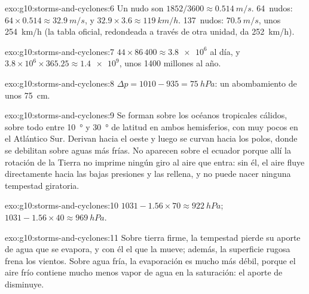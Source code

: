\begin{solution}{exo:g10:storms-and-cyclones:6}
Un nudo son $1852/3600 \approx \qty{0.514}{m/s}$. \num{64}~nudos: $64 \times
0.514 \approx \qty{32.9}{m/s}$, y $32.9 \times 3.6 \approx
\qty{119}{km/h}$. \num{137}~nudos: $\qty{70.5}{m/s}$, unos
\qty{254}{km/h} (la tabla oficial, redondeada a través de otra unidad, da
\qty{252}{km/h}).
\end{solution}

\begin{solution}{exo:g10:storms-and-cyclones:7}
$44 \times 86\,400 \approx \num{3.8e6}$  al día, y $3.8\times10^6
\times 365.25 \approx \num{1.4e9}$, unos 1400 millones al año.
\end{solution}

\begin{solution}{exo:g10:storms-and-cyclones:8}
$\Delta p = 1010 - 935 = \qty{75}{hPa}$: un abombamiento de unos \qty{75}{cm}.
\end{solution}

\begin{solution}{exo:g10:storms-and-cyclones:9}
Se forman sobre los océanos tropicales cálidos, sobre todo entre
\qty{10}{\degree} y \qty{30}{\degree} de latitud en ambos hemisferios, con
muy pocos en el Atlántico Sur. Derivan hacia el oeste y luego se curvan hacia
los polos, donde se debilitan sobre aguas más frías. No aparecen sobre el
ecuador porque allí la rotación de la Tierra no imprime ningún giro al aire
que entra: sin él, el aire fluye directamente hacia las bajas presiones y
las rellena, y no puede nacer ninguna tempestad giratoria.
\end{solution}

\begin{solution}{exo:g10:storms-and-cyclones:10}
$1031 - 1.56 \times 70 \approx \qty{922}{hPa}$; $1031 - 1.56 \times 40
\approx \qty{969}{hPa}$.
\end{solution}

\begin{solution}{exo:g10:storms-and-cyclones:11}
Sobre tierra firme, la tempestad pierde su aporte de agua que se evapora, y
con él el  que la mueve; además, la superficie rugosa frena los
vientos. Sobre agua fría, la evaporación es mucho más débil, porque el aire
frío contiene mucho menos vapor de agua en la saturación: el aporte de  disminuye.
\end{solution}

